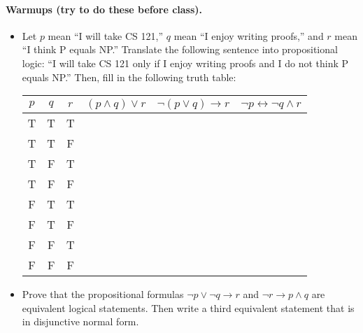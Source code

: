 \documentclass[12pt]{article}
\begin{document}
\paragraph*{Warmups (try to do these before class).}
\begin{itemize}
	\item Let $p$ mean ``I will take CS 121,'' $q$ mean ``I enjoy writing proofs,'' and $r$ mean ``I think P equals NP.'' Translate the following sentence into propositional logic: ``I will take CS 121 only if I enjoy writing proofs and I do not think P equals NP.'' Then, fill in the following truth table:
	\begin{center}
	\begin{tabular}{|c c c | c | c | c|}
	\hline
	$p$ & $q$ & $r$ & $(p \wedge q) \vee r$ & $\neg (p \vee q) \rightarrow r$ & $\neg p \leftrightarrow \neg q \wedge r$ \\ \hline
	T & T & T & & & \\ \hline
	T & T & F & & & \\ \hline
	T & F & T & & & \\ \hline
	T & F & F & & & \\ \hline
	F & T & T & & & \\ \hline
	F & T & F & & & \\ \hline
	F & F & T & & & \\ \hline
	F & F & F & & & \\ \hline
	\end{tabular}
	\end{center}
	
	\item Prove that the propositional formulas $\neg p \vee \neg q \rightarrow r$ and $\neg r \rightarrow p \wedge q$ are equivalent logical statements. Then write a third equivalent statement that is in disjunctive normal form.
	
\end{itemize}





\pagebreak
\end{document}
